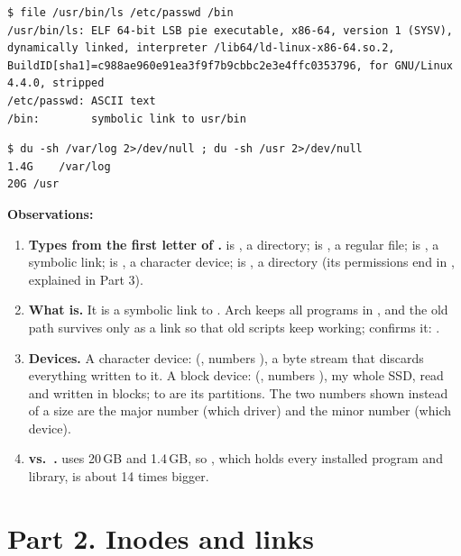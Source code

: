 \documentclass[11pt,a4paper]{article}
\begin{document}
\begin{lstlisting}[caption={file looks at the content, not the name}]
$ file /usr/bin/ls /etc/passwd /bin
/usr/bin/ls: ELF 64-bit LSB pie executable, x86-64, version 1 (SYSV), dynamically linked, interpreter /lib64/ld-linux-x86-64.so.2, BuildID[sha1]=c988ae960e91ea3f9f7b9cbbc2e3e4ffc0353796, for GNU/Linux 4.4.0, stripped
/etc/passwd: ASCII text
/bin:        symbolic link to usr/bin
\end{lstlisting}

\begin{lstlisting}[caption={Disk usage of /var/log and /usr}]
$ du -sh /var/log 2>/dev/null ; du -sh /usr 2>/dev/null
1.4G	/var/log
20G	/usr
\end{lstlisting}

\textbf{Observations:}
\begin{enumerate}
  \item \textbf{Types from the first letter of .}  is , a
  directory;  is \code{-}, a regular file;  is , a symbolic
  link;  is , a character device;  is , a directory
  (its permissions end in , explained in Part 3).
  \item \textbf{What  is.} It is a symbolic link to . Arch keeps all
  programs in , and the old path  survives only as a link so that old
  scripts keep working;  confirms it: .
  \item \textbf{Devices.} A character device:  (, numbers
  ), a byte stream that discards everything written to it. A block device:
   (, numbers ), my whole SSD, read and written in
  blocks;  to  are its partitions. The two numbers shown instead
  of a size are the major number (which driver) and the minor number (which device).
  \item \textbf{ vs.\ .}  uses 20\,GB and 
  1.4\,GB, so , which holds every installed program and library, is about 14 times
  bigger.
\end{enumerate}

\section{Part 2. Inodes and links}
\end{document}
